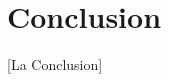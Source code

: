 \documentclass[10pt,journal,compsoc]{IEEEtran}
\begin{document}




\section{Conclusion}

[La Conclusion]






%


%
\end{document}
